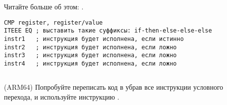 Читайте больше об этом: .

\begin{lstlisting}[caption=ARM (\ThumbMode),style=customasmARM]
CMP register, register/value
ITEEE EQ ; выставить такие суффиксы: if-then-else-else-else
instr1   ; инструкция будет исполнена, если истинно
instr2   ; инструкция будет исполнена, если ложно
instr3   ; инструкция будет исполнена, если ложно
instr4   ; инструкция будет исполнена, если ложно
\end{lstlisting}

\subsection{\Exercise}

(ARM64) Попробуйте переписать код в  
убрав все инструкции условного перехода, и используйте инструкцию .

